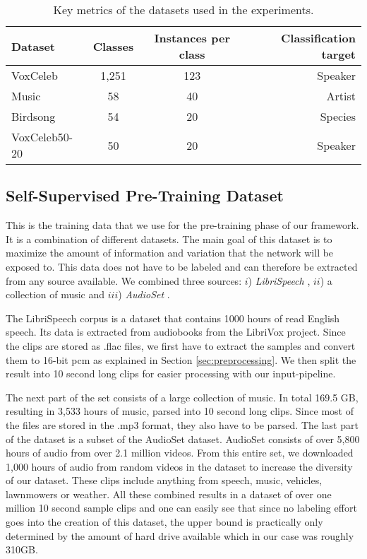 \begin{table}[htpb]
  \centering
  \begin{tabular}{l c c r}
    \toprule
        Dataset & Classes & Instances per class & Classification target \\
        \midrule
        VoxCeleb & 1,251 & 123 & Speaker \\
        Music & 58 & 40 & Artist \\
        Birdsong & 54 & 20 & Species \\
        VoxCeleb50-20 & 50 & 20 & Speaker \\
    \bottomrule
  \end{tabular}
  \caption[Datasets]{Key metrics of the datasets used in the experiments.}\label{tab:datasets}
\end{table}

\subsection{Self-Supervised Pre-Training Dataset}\label{subsec:ss_dataset}

This is the training data that we use for the pre-training phase of our framework. It is a combination of different datasets. The main goal of this dataset is to maximize the amount of information and variation that the network will be exposed to. This data does not have to be labeled and can therefore be extracted from any source available. We combined three sources: $i$) \textit{LibriSpeech} \cite{panayotov2015librispeech}, $ii$) a collection of music and $iii$) \textit{AudioSet} \cite{audioset}. 

The LibriSpeech corpus is a dataset that contains 1000 hours of read English speech. Its data is extracted from audiobooks from the LibriVox project. Since the clips are stored as .flac files, we first have to extract the samples and convert them to 16-bit \gls{pcm} as explained in Section \ref{sec:preprocessing}. We then split the result into 10 second long clips for easier processing with our input-pipeline.

The next part of the set consists of a large collection of music. In total 169.5 GB, resulting in 3,533 hours of music, parsed into 10 second long clips. Since most of the files are stored in the .mp3 format, they also have to be parsed. The last part of the dataset is a subset of the AudioSet dataset. AudioSet consists of over 5,800 hours of audio from over 2.1 million videos. From this entire set, we downloaded 1,000 hours of audio from random videos in the dataset to increase the diversity of our dataset. These clips include anything from speech, music, vehicles, lawnmowers or weather. All these combined results in a dataset of over one million 10 second sample clips and one can easily see that since no labeling effort goes into the creation of this dataset, the upper bound is practically only determined by the amount of hard drive available which in our case was roughly 310GB.

